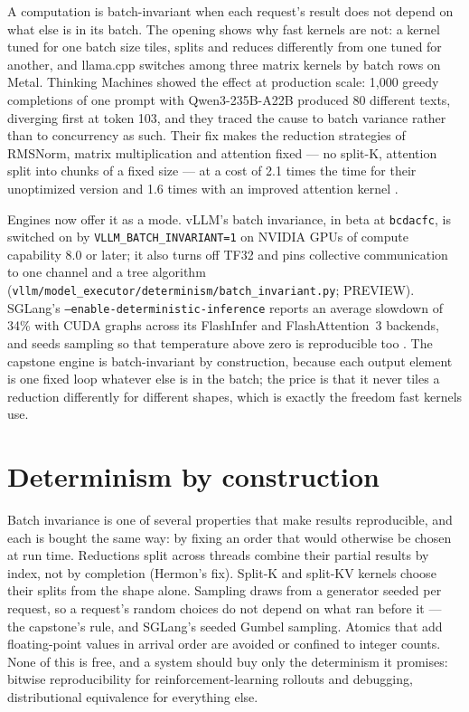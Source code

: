 A computation is batch-invariant when each request's result does not depend on
what else is in its batch. The opening shows why fast kernels are not: a
kernel tuned for one batch size tiles, splits and reduces differently from one
tuned for another, and llama.cpp switches among three matrix kernels by batch
rows on Metal. Thinking Machines showed the effect at production scale: 1,000
greedy completions of one prompt with Qwen3-235B-A22B produced 80 different
texts, diverging first at token 103, and they traced the cause to batch
variance rather than to concurrency as such. Their fix makes the reduction
strategies of RMSNorm, matrix multiplication and attention fixed --- no
split-K, attention split into chunks of a fixed size --- at a cost of 2.1 times
the time for their unoptimized version and 1.6 times with an improved attention
kernel \cite{he2025nondeterminism}.

Engines now offer it as a mode. vLLM's batch invariance, in beta at
\texttt{bcdacfc}, is switched on by \texttt{VLLM\_BATCH\_INVARIANT=1} on NVIDIA
GPUs of compute capability 8.0 or later; it also turns off TF32 and pins
collective communication to one channel and a tree algorithm
(\texttt{vllm/model\_executor/determinism/batch\_invariant.py}; PREVIEW).
SGLang's \texttt{--enable-deterministic-inference} reports an average slowdown of
34\% with CUDA graphs across its FlashInfer and FlashAttention~3 backends, and
seeds sampling so that temperature above zero is reproducible too
\cite{sglang2025deterministic}. The capstone engine is batch-invariant by
construction, because each output element is one fixed loop whatever else is
in the batch; the price is that it never tiles a reduction differently for
different shapes, which is exactly the freedom fast kernels use.

\section{Determinism by construction}

Batch invariance is one of several properties that make results reproducible,
and each is bought the same way: by fixing an order that would otherwise be
chosen at run time. Reductions split across threads combine their partial
results by index, not by completion (Hermon's fix). Split-K and split-KV kernels
choose their splits from the shape alone. Sampling draws from a generator seeded
per request, so a request's random choices do not depend on what ran before it
--- the capstone's rule, and SGLang's seeded Gumbel sampling. Atomics that add
floating-point values in arrival order are avoided or confined to integer counts.
None of this is free, and a system should buy only the determinism it promises:
bitwise reproducibility for reinforcement-learning rollouts and debugging,
distributional equivalence for everything else.

